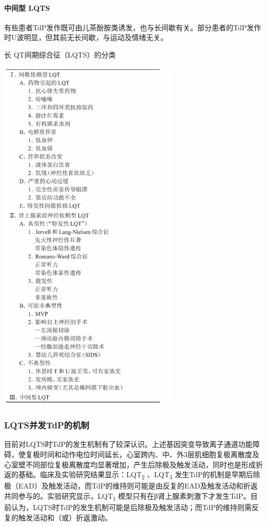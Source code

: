 \paragraph{中间型 LQTS}

有些患者TdP发作既可由儿茶酚胺类诱发，也与长间歇有关。部分患者的TdP发作时U波明显，但其前无长间歇，与运动及情绪无关。

\begin{table}[htbp]
\centering
\caption{长 QT间期综合征（LQTS）的分类}
\label{tab102-12}
\includegraphics[width=3.34375in,height=6.85417in]{./images/Image00444.jpg}
\end{table}

\subsubsection{LQTS并发TdP的机制}

目前对LQTS时TdP的发生机制有了较深认识。上述基因突变导致离子通道功能障碍，使复极时间和动作电位时间延长，心室跨内、中、外3层肌细胞复极离散度及心室壁不同部位复极离散度均显著增加，产生后除极及触发活动，同时也是形成折返的基础。临床及实验研究结果显示：LQT\textsubscript{2}
、LQT\textsubscript{3}
发生TdP的机制是早期后除极（EAD）及触发活动，而TdP的维持则可能是由反复的EAD及触发活动和折返共同参与的。实验研究显示，LQT\textsubscript{1}
模型只有在β肾上腺素刺激下才发生TdP。目前认为，LQTS时TdP的发生机制可能是后除极及触发活动；而TdP的维持则需反复的触发活动和（或）折返激动。

